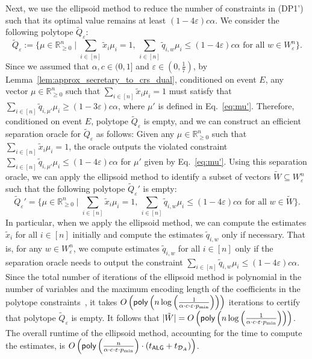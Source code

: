 \documentclass[11pt]{article}
\newcommand{\D}{\mathcal D}
\newcommand{\alg}{\textnormal{\sffamily ALG}}
\newcommand{\eps}{\varepsilon}
\newcommand{\poly}{\textnormal{\sffamily poly}}
\newcommand{\R}{{\mathbb R}}
\begin{document}
Next, we use the ellipsoid method to reduce the number of constraints in (DP1') such that its optimal value remains at least $(1-4\eps)c\alpha$. We consider the following polytope $\tilde{Q}_{\eps}$:
\[
    \tilde{Q}_{\eps}:=\{\mu\in\R_{\ge0}^n\mid \sum_{i\in[n]}\tilde{x}_i\mu_i=1,\,\sum_{i\in[n]} \tilde{q}_{i,w}\mu_i\le (1-4\eps)c\alpha\textrm{ for all }w\in W_{\eps}^n\}.
\]
Since we assumed that $\alpha,c\in(0,1]$ and $\eps\in\left(0,\frac{1}{7}\right)$, by Lemma~\ref{lem:approx_secretary_to_crs_dual}, conditioned on event $E$, any vector $\mu\in\R_{\ge0}^n$ such that $\sum_{i\in[n]}\tilde{x}_i\mu_i=1$ must satisfy that $\sum_{i\in[n]} \tilde{q}_{i,\mu'}\mu_i\ge(1-3\eps)c\alpha$, where $\mu'$ is defined in Eq.~\eqref{eq:mu'}. Therefore, conditioned on event $E$, polytope $\tilde{Q}_{\eps}$ is empty, and we can construct an efficient separation oracle for $\tilde{Q}_{\eps}$ as follows: Given any $\mu\in\R_{\ge0}^n$ such that $\sum_{i\in[n]}\tilde{x}_i\mu_i=1$, the oracle outputs the violated constraint $\sum_{i\in[n]} \tilde{q}_{i,\mu'}\mu_i\le (1-4\eps)c\alpha$ for $\mu'$ given by Eq.~\eqref{eq:mu'}. Using this separation oracle, we can apply the ellipsoid method to identify a subset of vectors $\tilde{W}\subseteq W_{\eps}^n$ such that the following polytope $\tilde{Q}_{\eps}'$ is empty:
\[
    \tilde{Q}_{\eps}'=\{\mu\in\R_{\ge0}^n\mid \sum_{i\in[n]}\tilde{x}_i\mu_i=1,\,\sum_{i\in[n]} \tilde{q}_{i,w}\mu_i\le (1-4\eps)c\alpha\textrm{ for all }w\in \tilde{W}\}.
\]
In particular, when we apply the ellipsoid method, we can compute the estimates $\tilde{x}_i$ for all $i\in[n]$ initially and compute the estimates $\tilde{q}_{i,w}$ only if necessary. That is, for any $w\in W_{\eps}^n$, we compute estimates $\tilde{q}_{i,w}$ for all $i\in[n]$ only if the separation oracle needs to output the constraint $\sum_{i\in[n]} \tilde{q}_{i,w}\mu_i\le (1-4\eps)c\alpha$. Since the total number of iterations of the ellipsoid method is polynomial in the number of variables and the maximum encoding length of the coefficients in the polytope constraints~\citep{grotschel2012geometric}, it takes $O\left(\poly\left(n\log\left(\frac{1}{\alpha\cdot c\cdot\eps\cdot p_{\min}}\right)\right)\right)$ iterations to certify that polytope $\tilde{Q}_{\eps}$ is empty. It follows that $|\tilde{W}|=O\left(\poly\left(n\log\left(\frac{1}{\alpha\cdot c\cdot\eps\cdot p_{\min}}\right)\right)\right)$. The overall runtime of the ellipsoid method, accounting for the time to compute the estimates, is $O\left(\poly\left(\frac{n}{\alpha\cdot c\cdot\eps\cdot p_{\min}}\right)\cdot(t_{\alg}+t_{\D_{A}})\right)$.
\end{document}
